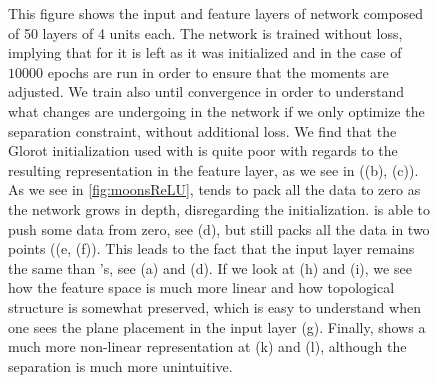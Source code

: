 \begin{figure}
  \caption{This figure shows the input and feature layers of network composed of 50 layers of 4 units each. The network is trained without loss, implying that for \ReLU it is left as it was initialized and in the case of \ReLUBN $10000$ epochs are run in order to ensure that the moments are adjusted. We train also \SepLayer until convergence in order to understand what changes are undergoing in the network if we only optimize the separation constraint, without additional loss. We find that the Glorot initialization used with \ReLU is quite poor with regards to the resulting representation in the feature layer, as we see in ((b), (c)). As we see in \ref{fig:moonsReLU}, \ReLU tends to pack all the data to zero as the network grows in depth, disregarding the initialization. \ReLUBN is able to push some data from zero, see (d), but still packs all the data in two points ((e, (f)). This leads to the fact that the input layer remains the same than \ReLU's, see (a) and (d). If we look at \SepLayer (h) and (i), we see how the feature space is much more linear and how topological structure is somewhat preserved, which is easy to understand when one sees the plane placement in the input layer (g). Finally, \SepPointUnit shows a much more non-linear representation at (k) and (l), although the separation is much more unintuitive.} 
  \label{fig:init} 
\end{figure}




